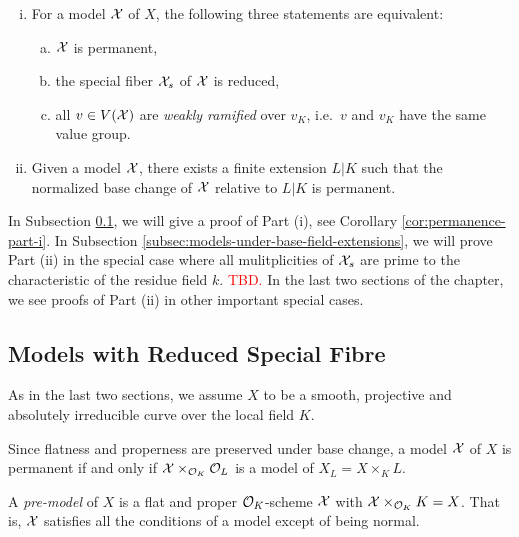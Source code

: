 \begin{theorem} \label{thm:permanence}
    \begin{enumerate}[(i)]
        \item For a model $\mathcal X$ of $X$,  the following three statements are equivalent:
            \begin{enumerate}[(a)]
                \item $\mathcal X$ is permanent,
                \item the special fiber $\mathcal X_s$ of $\mathcal X$ is reduced,
                \item all $v\in V(\mathcal X)$ are \emph{weakly ramified} over $v_K$, i.e.\ $v$ and $v_K$ have the same value group.
            \end{enumerate}
        \item Given a model $\mathcal X$, there exists a finite extension $L|K$ such that the normalized base change of $\mathcal X$ relative to $L|K$ is permanent.
    \end{enumerate}
\end{theorem}

In Subsection \ref{subsec:models-with-reduced-special-fibre}, we will give a proof of Part (i), see Corollary \ref{cor:permanence-part-i}.
In Subsection \ref{subsec:models-under-base-field-extensions}, we will prove Part (ii) in the special case where all mulitplicities of $\mathcal X_s$
are prime to the characteristic of the residue field $k$. \textcolor{red}{TBD.}
In the last two sections of the chapter, we see proofs of Part (ii) in other important special cases.

\subsection{Models with Reduced Special Fibre}\label{subsec:models-with-reduced-special-fibre}

As in the last two sections, we assume $X$ to be a smooth, projective and absolutely irreducible curve over the local
field $K$.


\begin{remark}
    Since flatness and properness are preserved under base change, a model $\mathcal X$ of $X$ is permanent if and only if
    $\mathcal X \times_{\mathcal O_K} \mathcal O_L$ is a model of $X_L = X \times_K L$.
\end{remark}

\begin{definition}
    A \textit{pre-model} of $X$ is a flat and proper $\mathcal O_K$-scheme $\mathcal X$ with $\mathcal X \times_{\mathcal O_K} K = X$.
    That is, $\mathcal X$ satisfies all the conditions of a model except of being normal.
\end{definition}

